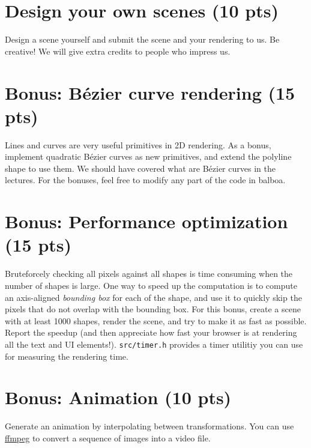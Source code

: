 \section{Design your own scenes (10 pts)}

Design a scene yourself and submit the scene and your rendering to us. Be creative! We will give extra credits to people who impress us.

\section{Bonus: B\'ezier curve rendering (15 pts)}

Lines and curves are very useful primitives in 2D rendering. 
As a bonus, implement quadratic B\'ezier curves as new primitives, and extend the polyline shape to use them.  
We should have covered what are B\'ezier curves in the lectures.
For the bonuses, feel free to modify any part of the code in balboa. 

\section{Bonus: Performance optimization (15 pts)}

Bruteforcely checking all pixels against all shapes is time consuming when the number of shapes is large. 
One way to speed up the computation is to compute an axis-aligned \emph{bounding box} for each of the shape, and use it to quickly skip the pixels that do not overlap with the bounding box. 
For this bonus, create a scene with at least 1000 shapes, render the scene, and try to make it as fast as possible. Report the speedup (and then appreciate how fast your browser is at rendering all the text and UI elements!). \lstinline{src/timer.h} provides a timer utilitiy you can use for measuring the rendering time.

\section{Bonus: Animation (10 pts)}

Generate an animation by interpolating between transformations. You can use \href{https://ffmpeg.org/}{ffmpeg} to convert a sequence of images into a video file.

%
%


